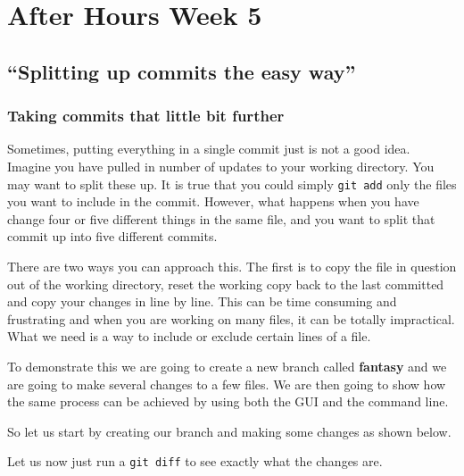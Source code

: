 \chapter{After Hours Week 5}
\section{``Splitting up commits the easy way''}
\subsection{Taking commits that little bit further}
Sometimes, putting everything in a single commit just is not a good idea.
Imagine you have pulled in number of updates to your working directory.
You may want to split these up.
It is true that you could simply \texttt{git add} only the files you want to include in the commit.
However, what happens when you have change four or five different things in the same file, and you want to split that commit up into five different commits.

There are two ways you can approach this.
The first is to copy the file in question out of the working directory, reset the working copy back to the last committed and copy your changes in line by line.
This can be time consuming and frustrating and when you are working on many files, it can be totally impractical.
What we need is a way to include or exclude certain lines of a file.

To demonstrate this we are going to create a new branch called \textbf{fantasy} and we are going to make several changes to a few files.
We are then going to show how the same process can be achieved by using both the GUI and the command line.

So let us start by creating our branch and making some changes as shown below.


Let us now just run a \texttt{git diff} to see exactly what the changes are.

